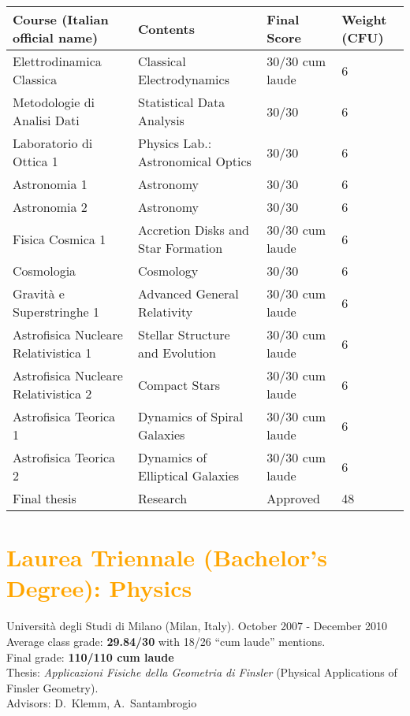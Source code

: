 \documentclass[a4paper,10pt,notitlepage]{paper}
\newcommand{\col}[1]{{\textcolor{Orange}{#1}}}
\begin{document}
{\begin{tabular*}{\linewidth}{l@{\hspace{0.65cm}}l@{\hspace{1.2cm}}l@{\hspace{0.7cm}}l@{\extracolsep{\fill}}}
\bf Course (Italian official name) & \bf Contents  & \bf Final Score &\bf Weight (CFU)\\
\hline \hline
Elettrodinamica Classica  					&  Classical Electrodynamics	 & 30/30 cum laude &   6 \\	
Metodologie di Analisi Dati				&  Statistical Data Analysis	&  30/30 &   6 \\
Laboratorio di Ottica 1					&  Physics Lab.: Astronomical Optics & 30/30 &   6\\	
Astronomia 1 							&  Astronomy &  30/30&   6\\	
Astronomia 2							&  Astronomy &30/30 &   6 \\	
Fisica Cosmica	1						&  Accretion Disks and Star Formation & 30/30 cum laude &   6\\	
Cosmologia  							&  Cosmology & 30/30&   6 \\	
Gravità e Superstringhe 1 					&  Advanced General Relativity & 30/30 cum laude &   6\\	
Astrofisica Nucleare Relativistica 1			&  Stellar Structure and Evolution & 30/30 cum laude&   6\\	
Astrofisica Nucleare Relativistica 2			&  Compact Stars  & 30/30 cum laude&   6\\
Astrofisica Teorica 1						&  Dynamics of Spiral Galaxies & 30/30 cum laude&   6\\	
Astrofisica Teorica 2						&  Dynamics of Elliptical Galaxies & 30/30 cum laude &   6\\
Final thesis						& Research  & Approved &  48\\
\end{tabular*}
}




\section*{\col{Laurea Triennale (Bachelor's Degree): Physics}}
Università degli Studi di Milano (Milan, Italy). October 2007 - December 2010\\
Average class grade: \textbf{29.84/30} with 18/26  ``cum laude'' mentions.\\
Final grade: \textbf{110/110 cum laude} \\
{Thesis}: {\it Applicazioni Fisiche della Geometria di Finsler} (Physical Applications of Finsler Geometry).\\
Advisors: D.~Klemm,  A.~Santambrogio\\
\end{document}
